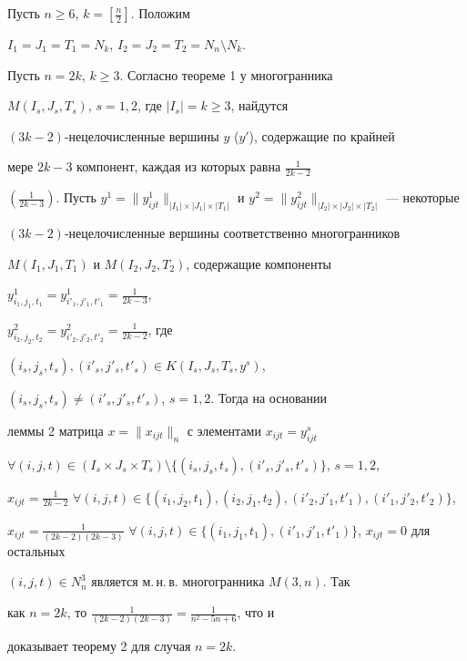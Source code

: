 \begin{pf}


Пусть $n\geq 6$, $k=[\frac{n}{2}]$. Положим


$I_1=J_1=T_1=N_k$, $I_2=J_2=T_2=N_n\setminus N_k$.





Пусть $n=2k$, $k\geq 3$. Согласно теореме 1 у многогранника


$M(I_s,J_s,T_s)$, $s=1,2$, где $|I_s|=k\geq 3$, найдутся


$(3k-2)$-нецелочисленные вершины $y$ ($y'$), содержащие по крайней


мере $2k-3$ компонент, каждая из которых равна $\frac{1}{2k-2}$


$\left(\frac{1}{2k-3}\right)$. Пусть $y^1


=\|y^1_{ijt}\|_{|I_1|\times |J_1|\times |T_1|}$ и $y^2


=\|y^2_{ijt}\|_{|I_2|\times |J_2|\times |T_2|}$ --- некоторые


$(3k-2)$-нецелочисленные вершины соответственно многогранников


$M(I_1,J_1,T_1)$ и $M(I_2,J_2,T_2)$, содержащие компоненты


$y^1_{i_1,j_1,t_1}=y^1_{i'_1,j'_1,t'_1}=\frac{1}{2k-3}$,


$y^2_{i_2,j_2,t_2}=y^2_{i'_2,j'_2,t'_2}=\frac{1}{2k-2}$, где


$(i_s,j_s,t_s),(i'_s,j'_s,t'_s)\in K(I_s,J_s,T_s,y^s)$,


$(i_s,j_s,t_s)\neq (i'_s,j'_s,t'_s)$, $s=1,2$. Тогда на основании


леммы 2 матрица $x=\|x_{ijt}\|_n$ с элементами $x_{ijt}=y^s_{ijt}$


$\forall (i,j,t)\in (I_s\times J_s\times T_s)\setminus


\{(i_s,j_s,t_s),(i'_s,j'_s,t'_s)\}$, $s=1,2$,


$x_{ijt}=\frac{1}{2k-2}$ $\forall (i,j,t)\in


\{(i_1,j_2,t_1),(i_2,j_1,t_2),(i'_2,j'_1,t'_1),(i'_1,j'_2,t'_2)\}$,


$x_{ijt}=\frac{1}{(2k-2)(2k-3)}$ $\forall (i,j,t)\in


\{(i_1,j_1,t_1),(i'_1,j'_1,t'_1)\}$, $x_{ijt}=0$ для остальных


$(i,j,t)\in N_n^3$ является м.\,н.\,в. многогранника $M(3,n)$. Так


как $n=2k$, то $\frac{1}{(2k-2)(2k-3)}=\frac{1}{n^2 -5n+6}$, что и


доказывает теорему 2 для случая $n=2k$.






\end{pf}
